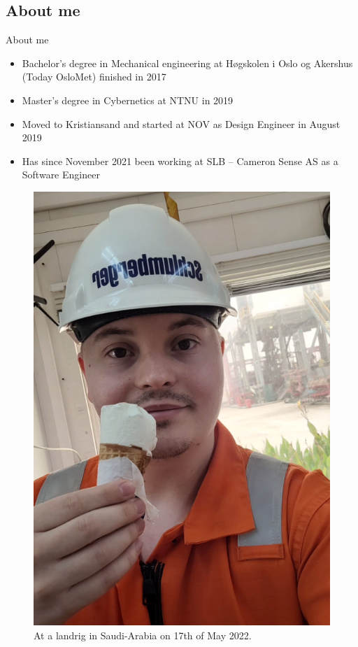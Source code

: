 \subsection{About me}
\begin{frame}{About me}

\begin{minipage}{0.64\textwidth}
\begin{itemize}
    \item Bachelor's degree in Mechanical engineering at Høgskolen i Oslo og Akershus (Today OsloMet) finished in 2017
    \item Master's degree in Cybernetics at NTNU in 2019
    \item Moved to Kristiansand and started at NOV as Design Engineer in August 2019
    \item Has since November 2021 been working at SLB -- Cameron Sense AS as a Software Engineer
\end{itemize}
\end{minipage}
\hfill
\begin{minipage}{0.29\textwidth}
\begin{figure}
\includegraphics[width=\textwidth]{LAH.png}
\caption{\label{fig:LAH}At a landrig in Saudi-Arabia on 17th of May 2022.}
\end{figure}
\end{minipage}

\end{frame}


